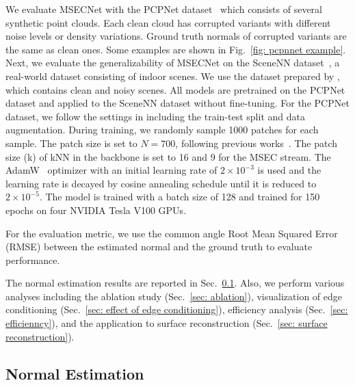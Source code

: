 \documentclass[sigconf]{acmart}
\begin{document}
We evaluate MSECNet with the PCPNet dataset~\cite{guerrero2018pcpnet} which consists of several synthetic point clouds. 
Each clean cloud has corrupted variants with different noise levels or density variations. Ground truth normals of corrupted variants are the same as clean ones. Some examples are shown in Fig.~\ref{fig: pcpnnet example}. Next, we evaluate the generalizability of MSECNet on the SceneNN dataset~\cite{hua2016scenenn}, a real-world dataset consisting of indoor scenes. We use the dataset prepared by \cite{li2022hsurf}, which contains clean and noisy scenes. All models are pretrained on the PCPNet dataset and applied to the SceneNN dataset without fine-tuning. 
For the PCPNet dataset, we follow the settings in \cite{guerrero2018pcpnet} including the train-test split and data augmentation. During training, we randomly sample 1000 patches for each sample. The patch size is set to $N=700$, following previous works~\cite{zhu2021adafit,li2022hsurf}. The patch size (k) of kNN in the backbone is set to 16 and 9 for the MSEC stream. 
The AdamW~\cite{loshchilov2018decoupled} optimizer with an initial learning rate of $2\times10^{-3}$ is used and the learning rate is decayed by cosine annealing schedule until it is reduced to $2\times10^{-5}$. The model is trained with a batch size of 128 and trained for 150 epochs on four NVIDIA Tesla V100 GPUs.

For the evaluation metric, we use the common angle Root Mean Squared Error (RMSE) between the estimated normal and the ground truth to evaluate performance.

The normal estimation results are reported in Sec.~\ref{sec: normal estimation}. Also, we perform various analyses including the ablation study (Sec.~\ref{sec: ablation}), visualization of edge conditioning (Sec.~\ref{sec: effect of edge conditioning}), efficiency analysis (Sec.~\ref{sec: efficienncy}), and the application to surface reconstruction (Sec.~\ref{sec: surface reconstruction}).



\subsection{Normal Estimation}\label{sec: normal estimation}
\end{document}
